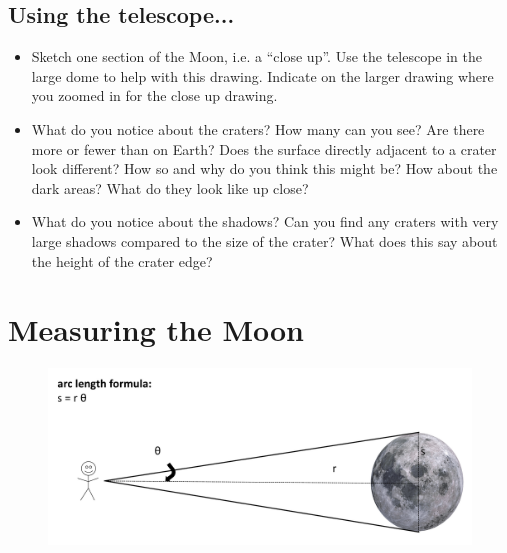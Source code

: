 \documentclass[12pt]{article}%
\begin{document}
\subsection*{Using the telescope...}
\begin{itemize}
    \item Sketch one section of the Moon, i.e. a ``close up''. 
    Use the telescope in the large dome to help with this drawing. 
    Indicate on the larger drawing where you zoomed in for the close up drawing. 
    \item What do you notice about the craters? How many can you see? Are there more or fewer than on Earth?  
    Does the surface directly adjacent to a crater look different?  
    How so and why do you think this might be?  
    How about the dark areas? What do they look like up close?
    \item What do you notice about the shadows?  
    Can you find any craters with very large shadows compared to the size of the crater?  
    What does this say about the height of the crater edge?
\end{itemize}


\section{Measuring the Moon}

\begin{figure}[htb!]
\center
\includegraphics[width=15cm]{arc_length.pdf}
\end{figure}
\end{document}
